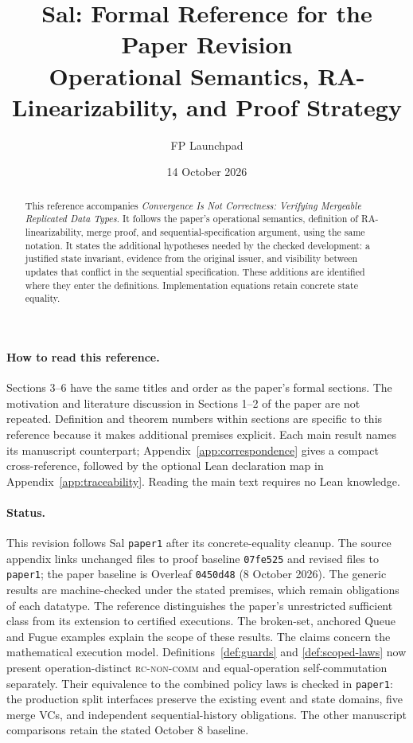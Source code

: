 \documentclass[11pt]{article}
\title{Sal: Formal Reference for the Paper Revision\\
\large Operational Semantics, RA-Linearizability, and Proof Strategy}
\author{FP Launchpad}
\date{14 October 2026}
\theoremstyle{definition}
\theoremstyle{remark}
\begin{document}
\maketitle
\begin{abstract}
This reference accompanies \emph{Convergence Is Not Correctness: Verifying
Mergeable Replicated Data Types}. It follows the paper's operational semantics,
definition of RA-linearizability, merge proof, and sequential-specification
argument, using the same notation. It states the additional hypotheses needed
by the checked development: a justified state invariant, evidence from the
original issuer, and visibility between updates that conflict in the sequential
specification. These additions are identified where they enter the definitions.
Implementation equations retain concrete state equality.
\end{abstract}
\paragraph{How to read this reference.}
Sections 3--6 have the same titles and order as the paper's formal sections.
The motivation and literature discussion in Sections 1--2 of the paper are not
repeated. Definition and theorem numbers within sections are specific to this
reference because it makes additional premises explicit. Each main result names
its manuscript counterpart; Appendix~\ref{app:correspondence} gives a compact
cross-reference, followed by the optional Lean declaration map in
Appendix~\ref{app:traceability}. Reading the main text requires no Lean knowledge.

\paragraph{Status.}
This revision follows Sal \texttt{paper1} after its concrete-equality cleanup.
The source appendix links unchanged files to proof baseline \texttt{07fe525}
and revised files to \texttt{paper1}; the paper
baseline is Overleaf \texttt{0450d48} (8 October 2026). The generic results are
machine-checked under the stated premises, which remain obligations of each
datatype. The reference distinguishes the paper's unrestricted sufficient class
from its extension to certified executions. The broken-set, anchored Queue and
Fugue examples explain the scope of these results. The claims concern the
mathematical execution model. Definitions~\ref{def:guards} and
\ref{def:scoped-laws} now present operation-distinct \textsc{rc-non-comm}
and equal-operation self-commutation separately. Their equivalence to the
combined policy laws is checked in \texttt{paper1}: the production
split interfaces preserve the existing event and state domains, five merge VCs,
and independent sequential-history obligations.
The other manuscript comparisons retain the stated October 8 baseline.
\setcounter{tocdepth}{1}
\tableofcontents
\clearpage
\setcounter{section}{2}




\appendix


\end{document}
